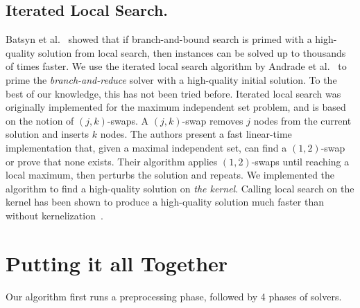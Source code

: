 \documentclass[twoside,leqno,twocolumn]{article}
\begin{document}
\subsection{Iterated Local Search.}
Batsyn et al.~\cite{batsyn-mcs-ils-2014} showed that if branch-and-bound search is primed with a high-quality solution from local search, then instances can be solved up to thousands of times faster. 
We use the iterated local search algorithm by Andrade et al.~\cite{andrade-2012} to prime the \emph{branch-and-reduce} solver with a high-quality initial solution. To the best of our knowledge, this has not been tried before. Iterated local search was originally implemented for the maximum independent set problem, and is based on the notion of $(j,k)$-swaps. A $(j,k)$-swap removes $j$ nodes from the current solution and inserts $k$ nodes. The authors present a fast linear-time implementation that, given a maximal independent set, can find a $(1,2)$-swap or prove that none exists. Their algorithm applies $(1,2)$-swaps until reaching a local maximum, then perturbs the solution and repeats. We implemented the algorithm to find a high-quality solution on \emph{the kernel}. Calling local search on the kernel has been shown to produce a high-quality solution much faster than without kernelization~\cite{chang2017computing,dahlum2016accelerating}.

\section{Putting it all Together}
\label{sec:puttingtogether}
Our algorithm first runs a preprocessing phase, followed by 4 phases of solvers.


%
\end{document}

